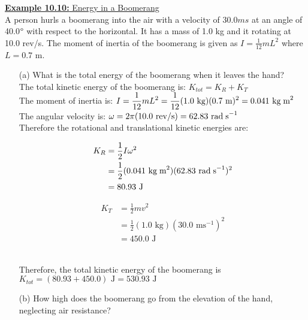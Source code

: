 \documentclass[a4paper]{article}
\let\bf\textbf
\newcommand\rads{\text{ rad\;s}^{-1}}
\newcommand\m{\text{ m}}
\newcommand\J{\text{ J}}
\newcommand\ms{\text{ ms}^{-1}}
\newcommand\kg{\text{ kg}}
\newcommand\kgmm{\text{ kg\;m}^{2}}
\begin{document}
\begin{shaded}
    \underline{\bf{Example 10.10:} Energy in a Boomerang}
    \vspace{2mm}\\
    A person hurls a boomerang into the air with a velocity of 30.0$ms$ at an angle of 40.0$\degree$ with respect to the horizontal. It has a mass of 1.0 kg and it rotating at 10.0 rev/s. The moment of inertia of the boomerang is given as $I = \frac{1}{12}mL^2$ where $L = 0.7\m$. 
    \begin{enumerate}
        \item[(a)] What is the total energy of the boomerang when it leaves the hand?
        \vspace{1mm}\\
        The total kinetic energy of the boomerang is: $K_{tot} = K_R + K_T$\\
        The moment of inertia is: $\displaystyle I = \frac{1}{12}mL^2 = \frac{1}{12}(1.0\kg)(0.7\m)^2 = 0.041\kgmm$\\
        The angular velocity is: $\omega = 2\pi(10.0\text{ rev/s}) = 62.83\rads$\\
        Therefore the rotational and translational kinetic energies are:\\
        \begin{minipage}{0.4\textwidth}
            \begin{align*}
                K_R &= \frac{1}{2}I\omega^2\\
                &= \frac{1}{2}(0.041\kgmm)(62.83\rads)^2\\
                &= 80.93\J
            \end{align*}            
        \end{minipage}
        \begin{minipage}{0.4\textwidth}
            \begin{align*}
                K_T &= \frac{1}{2}mv^2\\
                &= \frac{1}{2}(1.0\kg)(30.0\ms)^2\\
                &= 450.0\J
            \end{align*}
        \end{minipage}\\
        Therefore, the total kinetic energy of the boomerang is $\displaystyle K_{tot} = (80.93 + 450.0)\J = 530.93\J$
        \item[(b)] How high does the boomerang go from the elevation of the hand, neglecting air resistance?
        \vspace{1mm}\\

\end{enumerate}
\end{shaded}
\end{document}
